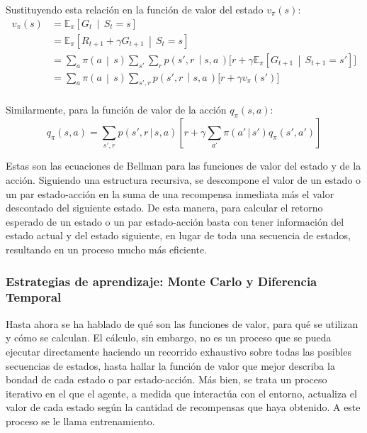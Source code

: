 Sustituyendo esta relación en la función de valor del estado $v_{\pi}(s)$:
\begin{equation}
\begin{split}
    v_{\pi}(s) &= \mathbb{E}_{\pi} \left[ G_t \, \middle| \, S_t = s \right] \\
    &= \mathbb{E}_{\pi} \left[ R_{t+1} + \gamma G_{t+1} \, \middle| \, S_t = s \right] \\
    &= \sum_{a} \pi \left( a \, \middle| \, s \right) \sum_{s'} \sum_{r} p \left( s', r \, \middle| s, a\, \right) \bigg[r + \gamma \mathbb{E}_{\pi} \left[ G_{t+1} \, \middle| \, S_{t+1}=s' \right] \bigg] \\
    &= \sum_{a} \pi \left( a \, \middle| \, s \right) \sum_{s', r} p \left( s', r \, \middle| s, a\, \right) \bigg[r + \gamma v_{\pi}(s') \bigg] \\
\end{split}
\label{eq:bellman-state}
\end{equation}

Similarmente, para la función de valor de la acción $q_\pi(s, a)$:
\begin{equation}
    q_{\pi}(s, a) = \sum_{s', r} p(s', r \,|\, s, a) \left[r + \gamma \sum_{a'} \pi(a' \,|\, s') q_{\pi}(s', a')\right]
\end{equation}

Estas son las ecuaciones de Bellman para las funciones de valor del estado y de la acción. Siguiendo una estructura recursiva, se descompone el valor de un estado o un par estado-acción en la suma de una recompensa inmediata más el valor descontado del siguiente estado. De esta manera, para calcular el retorno esperado de un estado o un par estado-acción basta con tener información del estado actual y del estado siguiente, en lugar de toda una secuencia de estados, resultando en un proceso mucho más eficiente.

\subsubsection{Estrategias de aprendizaje: Monte Carlo y Diferencia Temporal}

Hasta ahora se ha hablado de qué son las funciones de valor, para qué se utilizan y cómo se calculan. El cálculo, sin embargo, no es un proceso que se pueda ejecutar directamente haciendo un recorrido exhaustivo sobre todas las posibles secuencias de estados, hasta hallar la función de valor que mejor describa la bondad de cada estado o par estado-acción. Más bien, se trata un proceso iterativo en el que el agente, a medida que interactúa con el entorno, actualiza el valor de cada estado según la cantidad de recompensas que haya obtenido. A este proceso se le llama entrenamiento.

